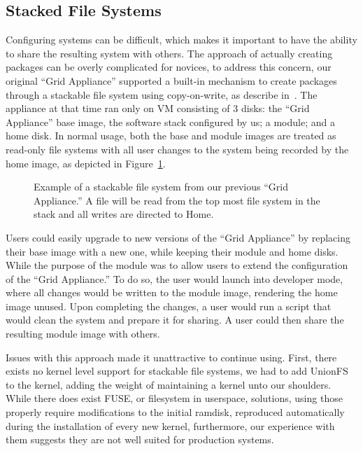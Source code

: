 \documentclass[conference]{IEEEtran}
\begin{document}
\subsection{Stacked File Systems}

Configuring systems can be difficult, which makes it important to have the
ability to share the resulting system with others.  The approach of actually
creating packages can be overly complicated for novices, to address this
concern, our original ``Grid Appliance'' supported a built-in mechanism to
create packages through a stackable file system using copy-on-write, as
describe in~\cite{vtdc}.  The appliance at that time ran only on VM consisting
of 3 disks: the ``Grid Appliance'' base image, the software stack configured by
us; a module; and a home disk.  In normal usage, both the base and module
images are treated as read-only file systems with all user changes to the
system being recorded by the home image, as depicted in
Figure~\ref{fig:stackfs}.

\begin{figure}[ht]
\centering
{}
\caption{Example of a stackable file system from our previous ``Grid
Appliance.''  A file will be read from the top most file system in the stack
and all writes are directed to Home.}
\label{fig:stackfs}
\end{figure}

Users could easily upgrade to new versions of the ``Grid Appliance'' by
replacing their base image with a new one, while keeping their module and home
disks.  While the purpose of the module was to allow users to extend the
configuration of the ``Grid Appliance.''  To do so, the user would launch into
developer mode, where all changes would be written to the module image,
rendering the home image unused.  Upon completing the changes, a user would run
a script that would clean the system and prepare it for sharing.  A user could
then share the resulting module image with others.

Issues with this approach made it unattractive to continue using.  First, there
exists no kernel level support for stackable file systems, we had to add
UnionFS~\cite{unionfs} to the kernel, adding the weight of maintaining a kernel
unto our shoulders.  While there does exist FUSE, or filesystem in userspace,
solutions, using those properly require modifications to the initial ramdisk,
reproduced automatically during the installation of every new kernel,
furthermore, our experience with them suggests they are not well suited for
production systems.
\end{document}
